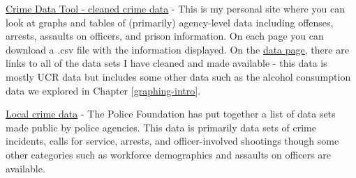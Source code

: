 \documentclass[
  12pt,
  openany]{book}
\begin{document}
\href{http://jacobdkaplan.com/data}{Crime Data Tool - cleaned crime data} - This is my personal site where you can look at graphs and tables of (primarily) agency-level data including offenses, arrests, assaults on officers, and prison information. On each page you can download a .csv file with the information displayed. On the \href{http://jacobdkaplan.com/data.html}{data page}, there are links to all of the data sets I have cleaned and made available - this data is mostly UCR data but includes some other data such as the alcohol consumption data we explored in Chapter \ref{graphing-intro}.

\href{https://www.policedatainitiative.org/datasets/}{Local crime data} - The Police Foundation has put together a list of data sets made public by police agencies. This data is primarily data sets of crime incidents, calls for service, arrests, and officer-involved shootings though some other categories such as workforce demographics and assaults on officers are available.

  
\end{document}
